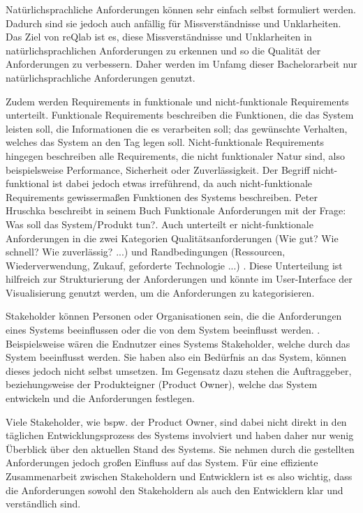     
    Natürlichsprachliche Anforderungen können sehr einfach selbst formuliert werden.
    Dadurch sind sie jedoch auch anfällig für Missverständnisse und Unklarheiten.
    Das Ziel von reQlab ist es, diese Missverständnisse und Unklarheiten in natürlichsprachlichen Anforderungen zu erkennen und so die Qualität der Anforderungen zu verbessern.
    Daher werden im Unfamg dieser Bachelorarbeit nur natürlichsprachliche Anforderungen genutzt.

    Zudem werden Requirements in funktionale und nicht-funktionale Requirements unterteilt.
    Funktionale Requirements beschreiben \glqq{}die Funktionen, die das System leisten soll, die Informationen die es verarbeiten soll; das gewünschte Verhalten, welches das System an den Tag legen soll.\grqq{} \autocite[][S. 12]{Hruschka2023}
    Nicht-funktionale Requirements hingegen beschreiben alle Requirements, die nicht funktionaler Natur sind, also beispielsweise Performance, Sicherheit oder Zuverlässigkeit.
    Der Begriff nicht-funktional ist dabei jedoch etwas irreführend, da auch nicht-funktionale Requirements gewissermaßen Funktionen des Systems beschreiben.
    Peter Hruschka beschreibt in seinem Buch Funktionale Anforderungen mit der Frage: \glqq{}Was soll das System/Produkt tun?\grqq{}.
    Auch unterteilt er nicht-funktionale Anforderungen in die zwei Kategorien Qualitätsanforderungen (\glqq{}Wie gut? Wie schnell? Wie zuverlässig? ...\grqq{}) und Randbedingungen (\glqq{}Ressourcen, Wiederverwendung, Zukauf, geforderte Technologie ...\grqq{}) \grqq{} \autocite[][S. 13]{Hruschka2023}.
    Diese Unterteilung ist hilfreich zur Strukturierung der Anforderungen und könnte im User-Interface der Visualisierung genutzt werden, um die Anforderungen zu kategorisieren.
    

    Stakeholder können \glqq{}Personen oder Organisationen sein, die die Anforderungen eines Systems beeinflussen oder die von dem System beeinflusst werden.\grqq{} \autocite[][]{ireb_cpre_glossary}.
    Beispielsweise wären die Endnutzer eines Systems Stakeholder, welche durch das System beeinflusst werden.
    Sie haben also ein Bedürfnis an das System, können dieses jedoch nicht selbst umsetzen.
    Im Gegensatz dazu stehen die Auftraggeber, beziehungsweise der Produkteigner (Product Owner), welche das System entwickeln und die Anforderungen festlegen.

    Viele Stakeholder, wie bspw. der Product Owner, sind dabei nicht direkt in den täglichen Entwicklungsprozess des Systems involviert und haben daher nur wenig Überblick über den aktuellen Stand des Systems.
    Sie nehmen durch die gestellten Anforderungen jedoch großen Einfluss auf das System.
    Für eine effiziente Zusammenarbeit zwischen Stakeholdern und Entwicklern ist es also wichtig, dass die Anforderungen sowohl den Stakeholdern als auch den Entwicklern klar und verständlich sind.

